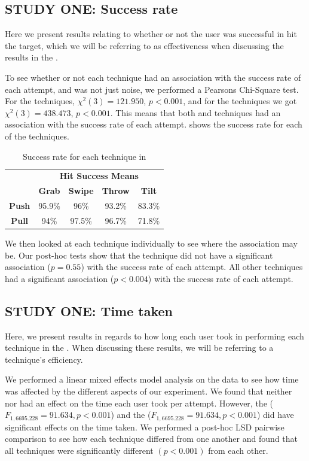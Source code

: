 \subsection{STUDY ONE: Success rate}
Here we present results relating to whether or not the user was successful in hit the target, which we will be referring to as effectiveness when discussing the results in the \target. 

To see whether or not each technique had an association with the success rate of each attempt, and was not just noise, we performed a Pearsons Chi-Square test.
For the \push techniques, $\chi^2(3)=121.950$, $p<0.001$, and for the \pull techniques we got $\chi^2(3)=438.473$, $p<0.001$. 
This means that both \push and \pull techniques had an association with the success rate of each attempt.
 shows the success rate for each of the techniques. 

\begin{table}[H]
	\centering
	\def\arraystretch{1.5}
		\begin{tabular}{c c c c c}
			& \multicolumn{4}{c}{\textbf{Hit Success Means}} \\
			\cline{2-5}
			& \textbf{Grab} & \textbf{Swipe} & \textbf{Throw} & \textbf{Tilt} \\ \hline
			\textbf{Push} & 95.9\% & 96\% & 93.2\% & 83.3\% \\ \hline
			\textbf{Pull} & 94\% & 97.5\% & 96.7\% & 71.8\% \\ \hline
		\end{tabular}
	\caption{Success rate for each technique in \target}
	\label{tab:successRate}
\end{table}

We then looked at each technique individually to see where the association may be.
Our post-hoc tests show that the \throw \push technique did not have a significant association ($p=0.55$) with the success rate of each attempt.
All other techniques had a significant association ($p<0.004$) with the success rate of each attempt. 

\subsection{STUDY ONE: Time taken}
Here, we present results in regards to how long each user took in performing each technique in the \target. 
When discussing these results, we will be referring to a technique's efficiency.

We performed a linear mixed effects model analysis on the data to see how time was affected by the different aspects of our experiment. 
We found that neither \effectiveness nor \direction had an effect on the time each user took per attempt. 
However, the \targetsize ($F_{1,6695.228} = 91.634, p < 0.001$) and the \technique ($F_{1,6695.228} = 91.634, p < 0.001$) did have significant effects on the time taken. 
We performed a post-hoc LSD pairwise comparison to see how each technique differed from one another and found that all techniques were significantly different $(p<0.001)$ from each other. 

